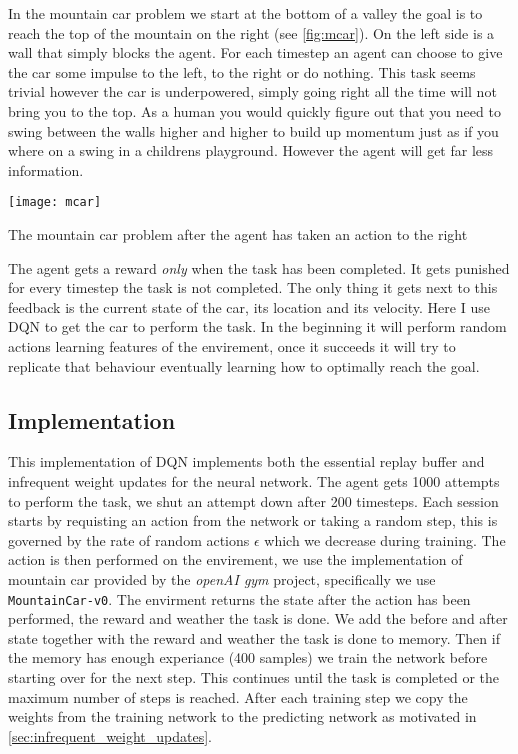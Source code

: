 \label{sec:mountain_car}
In the mountain car problem we start at the bottom of a valley the goal is to reach the top of the mountain on the right (see \autoref{fig:mcar}). On the left side is a wall that simply blocks the agent. For each timestep an agent can choose to give the car some impulse to the left, to the right or do nothing. This task seems trivial however the car is underpowered, simply going right all the time will not bring you to the top. As a human you would quickly figure out that you need to swing between the walls higher and higher to build up momentum just as if you where on a swing in a childrens playground. However the agent will get far less information. 

\begin{marginfigure}
    \texttt{[image: mcar]}
    \caption{The mountain car problem after the agent has taken an action to the right}
    \label{fig:mcar}
\end{marginfigure}

The agent gets a reward \textit{only} when the task has been completed. It gets punished for every timestep the task is not completed. The only thing it gets next to this feedback is the current state of the car, its location and its velocity. Here I use DQN to get the car to perform the task. In the beginning it will perform random actions learning features of the envirement, once it succeeds it will try to replicate that behaviour eventually learning how to optimally reach the goal.

\subsection{Implementation}
\label{sec:mcar_impl}
This implementation of DQN implements both the essential replay buffer and infrequent weight updates for the neural network. The agent gets 1000 attempts to perform the task, we shut an attempt down after 200 timesteps. Each session starts by requisting an action from the network or taking a random step, this is governed by the rate of random actions $\epsilon$ which we decrease during training. The action is then performed on the envirement, we use the implementation of mountain car provided by the \textit{openAI gym} project, specifically we use \texttt{MountainCar-v0}. The envirment returns the state after the action has been performed, the reward and weather the task is done. We add the before and after state together with the reward and weather the task is done to memory. Then if the memory has enough experiance (400 samples) we train the network before starting over for the next step. This continues until the task is completed or the maximum number of steps is reached. After each training step we copy the weights from the training network to the predicting network as motivated in \autoref{sec:infrequent_weight_updates}. 

